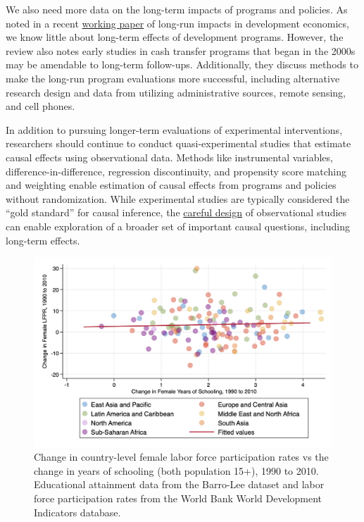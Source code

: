 \documentclass[11pt]{article}
\begin{document}

We also need more data on the long-term impacts of programs and policies. As noted in a recent \href{https://www.nber.org/papers/w25356}{working paper} of long-run impacts in development economics, we know little about long-term effects of development programs. However, the review also notes early studies in cash transfer programs that began in the 2000s may be amendable to long-term follow-ups. Additionally, they discuss methods to make the long-run program evaluations more successful, including alternative research design and data from utilizing administrative sources, remote sensing, and cell phones.


In addition to pursuing longer-term evaluations of experimental interventions, researchers should continue to conduct quasi-experimental studies that estimate causal effects using observational data. Methods like instrumental variables, difference-in-difference, regression discontinuity, and propensity score matching and weighting enable estimation of causal effects from programs and policies without randomization. While experimental studies are typically considered the ``gold standard'' for causal inference, the \href{https://onlinelibrary.wiley.com/doi/abs/10.1002/sim.2739}{careful design} of observational studies can enable exploration of a broader set of important causal questions, including long-term effects.

\begin{figure}
	\centering
	\includegraphics[width=0.9 \linewidth]{LFPRF_yrsch.png}
	\caption{\small Change in country-level female labor force participation rates vs the change in years of schooling (both population 15+), 1990 to 2010. Educational attainment data from the Barro-Lee dataset and labor force participation rates from the World Bank World Development Indicators database. }
	\label{fig:LFPRFyrsch}
\end{figure}
\end{document}

